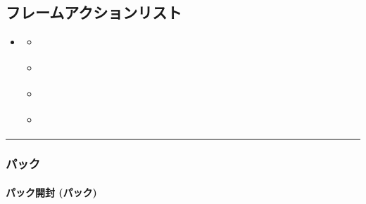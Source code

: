 \documentclass[letterpaper,10pt,dvipdfmx]{sphinxmanual}
\begin{document}
\subsection{フレームアクションリスト}
\label{\detokenize{auto/frameActionlist:act-act-frame}}\label{\detokenize{auto/frameActionlist:id1}}\label{\detokenize{auto/frameActionlist::doc}}
\begin{sphinxShadowBox}
\begin{itemize}
\item {} 
\sphinxAtStartPar
{}\label{\detokenize{auto/frameActionlist:id8}}{\hyperref[\detokenize{auto/frameActionlist:id3}]{}}
\begin{itemize}
\item {} 
\sphinxAtStartPar
{}\label{\detokenize{auto/frameActionlist:id9}}{\hyperref[\detokenize{auto/frameActionlist:act-packopen}]{}}

\item {} 
\sphinxAtStartPar
{}\label{\detokenize{auto/frameActionlist:id10}}{\hyperref[\detokenize{auto/frameActionlist:act-raredraw}]{}}

\item {} 
\sphinxAtStartPar
{}\label{\detokenize{auto/frameActionlist:id11}}{\hyperref[\detokenize{auto/frameActionlist:act-summonsrare}]{}}

\item {} 
\sphinxAtStartPar
{}\label{\detokenize{auto/frameActionlist:id12}}{\hyperref[\detokenize{auto/frameActionlist:act-trapcounter}]{}}

\end{itemize}

\end{itemize}
\end{sphinxShadowBox}


\bigskip\hrule\bigskip



\subsubsection{パック}
\label{\detokenize{auto/frameActionlist:id3}}

\paragraph{パック開封 (パック)}
\label{\detokenize{auto/frameActionlist:act-packopen}}\label{\detokenize{auto/frameActionlist:id4}}
\sphinxAtStartPar
{}
\end{document}
